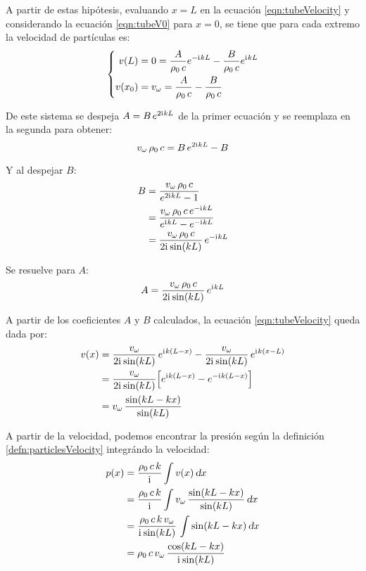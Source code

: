 \documentclass[a5paper,12pt,twoside]{book}
\begin{document}
A partir de estas hipótesis, evaluando $x=L$ en la ecuación \ref{eqn:tubeVelocity} y considerando la ecuación \ref{eqn:tubeV0} para $x=0$, se tiene que para cada extremo la velocidad de partículas es:
\begin{equation*}
    \left\{
    \begin{aligned}
        v(L) &= 0 = \frac{A}{\rho_0 \, c} e^{-\mathrm{i}\mkern1mu k L} - \frac{B}{\rho_0 \, c} e^{\mathrm{i}\mkern1mu k L}
        \\
        v(x_0) &= v_\omega = \frac{A}{\rho_0 \, c} - \frac{B}{\rho_0 \, c}
    \end{aligned}
    \right.
\end{equation*}

De este sistema se despeja $A = B \, e^{2 \mathrm{i}\mkern1mu kL}$ de la primer ecuación y se reemplaza en la segunda para obtener:
\begin{equation*}
    v_\omega \, \rho_0 \, c = B \, e^{2 \mathrm{i}\mkern1mu kL} - B
\end{equation*}

Y al despejar $B$:
\begin{align*}
    B &= \frac{v_\omega \, \rho_0 \, c}{e^{2 \mathrm{i}\mkern1mu kL}-1}
    \\
    &= \frac{v_\omega \, \rho_0 \, c \, e^{-\mathrm{i}\mkern1mu kL}}{e^{\mathrm{i}\mkern1mu kL}-e^{-\mathrm{i}\mkern1mu kL}}
    \\
    &= \frac{v_\omega \, \rho_0 \, c}{2\mathrm{i}\mkern1mu \sin(kL)} \, e^{-\mathrm{i}\mkern1mu kL}
\end{align*}

Se resuelve para $A$:
\begin{equation*}
    A = \frac{v_\omega \, \rho_0 \, c}{2\mathrm{i}\mkern1mu \sin(kL)} \, e^{\mathrm{i}\mkern1mu kL}
\end{equation*}

A partir de los coeficientes $A$ y $B$ calculados, la ecuación \ref{eqn:tubeVelocity} queda dada por:
\begin{align*}
    v(x) &=
    \frac{v_\omega}{2\mathrm{i}\mkern1mu \sin(kL)} \, e^{\mathrm{i}\mkern1mu k(L-x)}
    - \frac{v_\omega}{2\mathrm{i}\mkern1mu \sin(kL)} \, e^{\mathrm{i}\mkern1mu k(x-L)}
    \\
    &= \frac{v_\omega}{2\mathrm{i}\mkern1mu \sin(kL)} \Big[ e^{\mathrm{i}\mkern1mu k(L-x)} - e^{-\mathrm{i}\mkern1mu k(L-x)} \Big]
    \\
    &= v_\omega \, \frac{\sin(kL-kx)}{\sin(kL)}
\end{align*}

A partir de la velocidad, podemos encontrar la presión según la definición \ref{defn:particlesVelocity} integrándo la velocidad:
\begin{align*}
    p(x) &= \frac{\rho_0 \, c \, k}{\mathrm{i}\mkern1mu} \int v(x) \, \textsl{d} x
    \\
    &= \frac{\rho_0 \, c \, k}{\mathrm{i}\mkern1mu} \int v_\omega \, \frac{\sin(kL-kx)}{\sin(kL)} \, \textsl{d} x
    \\
    &= \frac{\rho_0 \, c \, k \, v_\omega}{\mathrm{i}\mkern1mu \sin(kL)} \, \int \sin(kL-kx) \, \textsl{d} x
    \\
    &= \rho_0 \, c \, v_\omega \, \frac{\cos (kL-kx)}{\mathrm{i}\mkern1mu \sin(kL)}
\end{align*}
\end{document}
